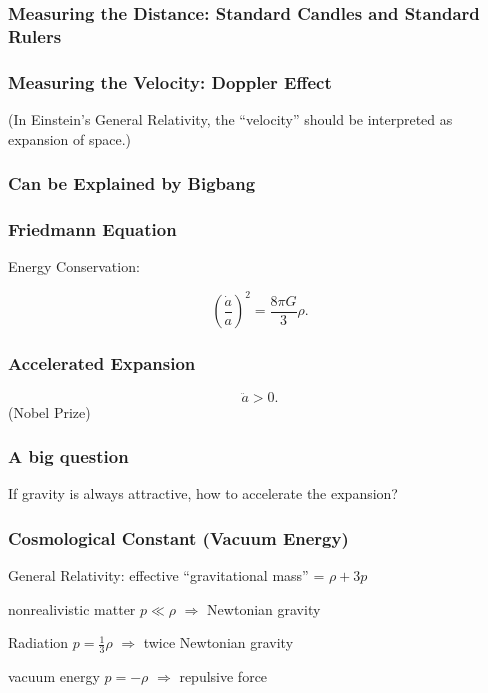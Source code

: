 \documentclass[CJK]{beamer}
\begin{document}
\begin{frame}
  \frametitle{Measuring the Distance: Standard Candles and Standard Rulers}



\end{frame}

\begin{frame}
  \frametitle{Measuring the Velocity: Doppler Effect}


(In Einstein's General Relativity, the ``velocity'' should be interpreted as expansion of space.)
\end{frame}



\begin{frame}
  \frametitle{Can be Explained by Bigbang}
\end{frame}


\begin{frame}
  \frametitle{Friedmann Equation}
             {\Large

               Energy Conservation:
               
    $$ \left(\frac{\dot a}{a}\right)^2 = \frac{8\pi G}{3}\rho. $$

    }
\end{frame}


\begin{frame}
  \frametitle{Accelerated Expansion}
  
{\Large
  $$\ddot a > 0. $$
  (Nobel Prize)
  }
\end{frame}

\begin{frame}
  \frametitle{A big question}

  {\Large

    If gravity is always attractive, how to accelerate the expansion?}
\end{frame}


\begin{frame}
  \frametitle{Cosmological Constant (Vacuum Energy)}
  General Relativity:  effective ``gravitational mass'' = $\rho + 3 p $

  
  \bitem
\item{nonrealivistic matter $p\ll \rho$ $\Rightarrow$  Newtonian gravity}
\item{Radiation $p = \frac{1}{3} \rho$ $\Rightarrow$ twice Newtonian gravity}
\item{vacuum energy $ p= -\rho$ $\Rightarrow$ repulsive force}
  \eitem

\end{frame}
\end{document}
